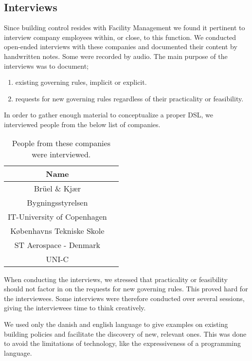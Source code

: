 \documentclass{llncs}
\begin{document}
\subsection{Interviews}\label{subsec:interviews}
Since building control resides with Facility Management we found it pertinent to interview company employees within, or close, to this function. We conducted open-ended interviews with these companies and documented their content by handwritten notes. Some were recorded by audio. The main purpose of the interviews was to document;

\begin{enumerate}
	\item existing governing rules, implicit or explicit.
	\item requests for new governing rules regardless of their practicality or feasibility.
\end{enumerate}

In order to gather enough material to conceptualize a proper DSL, we interviewed people from the below list of companies.\\ 

\begin{table}[htdp]
\begin{center}
\begin{tabular}{|c|c|}
	\textbf{Name}\\
	\hline 
	Br\"{u}el \& Kj\ae r\\
	Bygningsstyrelsen\\
	IT-University of Copenhagen\\
	K\o benhavns Tekniske Skole\\
	ST Aerospace - Denmark\\
	UNI-C\\
\end{tabular}
\end{center}
\label{tab:interviewees}
\caption{People from these companies were interviewed.}
\end{table}%

When conducting the interviews, we stressed that practicality or feasibility should not factor in on the requests for new governing rules. This proved hard for the interviewees. Some interviews were therefore conducted over several sessions, giving the interviewees time to think creatively. 

We used only the danish and english language to give examples on existing building policies and facilitate the discovery of new, relevant ones. This was done to avoid the limitations of technology, like the expressiveness of a programming language.
\end{document}
